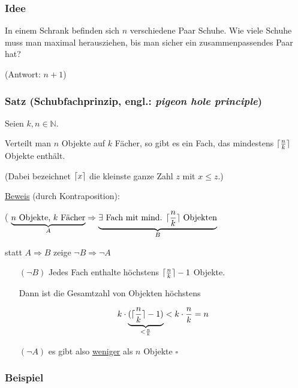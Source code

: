 \documentclass[a4paper, 12pt, twoside] {article}
\DeclarePairedDelimiter\ceil{\lceil}{\rceil}
\begin{document}
\subsubsection{Idee} %
In einem Schrank befinden sich $n$ verschiedene Paar Schuhe. Wie viele Schuhe muss man maximal herausziehen, bis man sicher ein zusammenpassendes Paar hat?

(Antwort: $n+1$)

\subsubsection{Satz (Schubfachprinzip, engl.: {\it pigeon hole principle})} %

Seien $k,n \in \mathbb{N}$.

Verteilt man $n$ Objekte auf $k$ Fächer, so gibt es ein Fach, das mindestens $\ceil{\frac{n}{k}}$ Objekte enthält.

(Dabei bezeichnet $\ceil{x}$ die kleinste ganze Zahl $z$ mit $x \leq z$.)

\underline{Beweis} (durch Kontraposition):

( $\underbrace{n \text{ Objekte, } k \text{ Fächer}}_{A} \Rightarrow \underbrace{\exists \text{ Fach mit mind. } \ceil{\frac{n}{k}} \text{ Objekten}}_{B}$

statt $A \Rightarrow B$ zeige $\neg B \Rightarrow \neg A$

\begin{itemize}
\item[$(\neg B)$]
	Jedes Fach enthalte höchstens $\ceil{\frac{n}{k}}-1$ Objekte.
	
	Dann ist die Gesamtzahl von Objekten höchstens
	
	$$k \cdot \underbrace{(\ceil{\frac{n}{k}}-1)}_{< \frac{n}{k}} < k \cdot \frac{n}{k} = n$$

\item[$(\neg A)$]
	es gibt also \underline{weniger} als $n$ Objekte
	\hfill $\square$

\end{itemize}


\subsubsection{Beispiel} %
\end{document}
